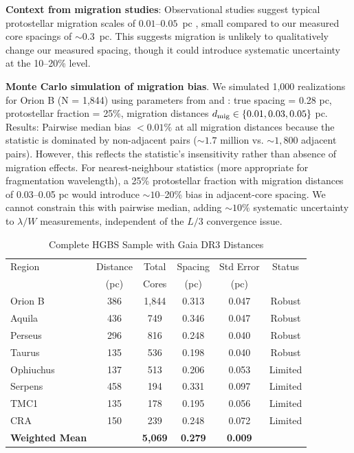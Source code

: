 \documentclass[twocolumn,usenatbib]{mnras}
\begin{document}
\textbf{Context from migration studies}: Observational studies suggest typical protostellar migration scales of $0.01$--$0.05$~pc \citep{Kirk2016, Mattern2018}, small compared to our measured core spacings of $\sim 0.3$~pc. This suggests migration is unlikely to qualitatively change our measured spacing, though it could introduce systematic uncertainty at the 10--20\% level.

\textbf{Monte Carlo simulation of migration bias}. We simulated 1,000 realizations for Orion B (N = 1,844) using parameters from \citet{Kirk2016} and \citet{Mattern2018}: true spacing = 0.28 pc, protostellar fraction = 25\%, migration distances $d_{\rm mig} \in \{0.01, 0.03, 0.05\}$ pc. Results: Pairwise median bias $<0.01\%$ at all migration distances because the statistic is dominated by non-adjacent pairs ($\sim1.7$ million vs. $\sim1,800$ adjacent pairs). However, this reflects the statistic's insensitivity rather than absence of migration effects. For nearest-neighbour statistics (more appropriate for fragmentation wavelength), a 25\% protostellar fraction with migration distances of 0.03--0.05 pc would introduce $\sim10$--20\% bias in adjacent-core spacing. We cannot constrain this with pairwise median, adding $\sim10\%$ systematic uncertainty to $\lambda/W$ measurements, independent of the $L/3$ convergence issue.

\begin{table}
\caption{Complete HGBS Sample with Gaia DR3 Distances}
\label{tab:sample}
\begin{tabular}{lccccc}
\toprule
Region & Distance & Total & Spacing & Std Error & Status \\
       & (pc)   & Cores & (pc)   & (pc)      &  \\
\midrule
Orion B  & 386 & 1,844 & 0.313 & 0.047 & Robust \\
Aquila   & 436 & 749   & 0.346 & 0.047 & Robust \\
Perseus  & 296 & 816   & 0.248 & 0.040 & Robust \\
Taurus   & 135 & 536   & 0.198 & 0.040 & Robust \\
Ophiuchus& 137 & 513   & 0.206 & 0.053 & Limited \\
Serpens  & 458 & 194   & 0.331 & 0.097 & Limited \\
TMC1     & 135 & 178   & 0.195 & 0.056 & Limited \\
CRA      & 150 & 239   & 0.248 & 0.072 & Limited \\
\midrule
\textbf{Weighted Mean} &  & \textbf{5,069} & \textbf{0.279} & \textbf{0.009} &  \\
\bottomrule
\end{tabular}
\end{table}
\end{document}
